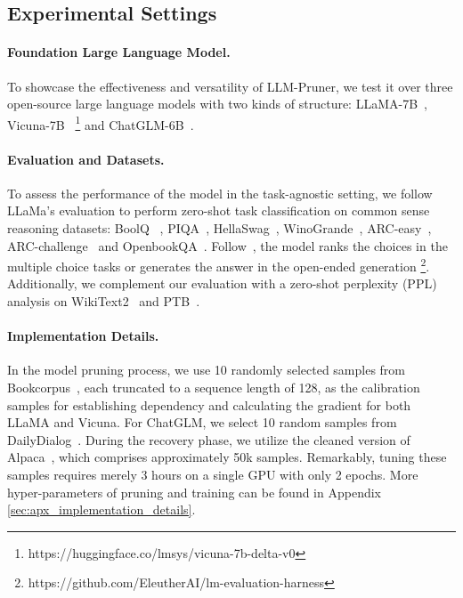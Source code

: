 \subsection{Experimental Settings}
\paragraph{Foundation Large Language Model.}
To showcase the effectiveness and versatility of LLM-Pruner, we test it over three open-source large language models with two kinds of structure: LLaMA-7B~\cite{touvron2023llama}, Vicuna-7B~\cite{vicuna2023} \footnote{https://huggingface.co/lmsys/vicuna-7b-delta-v0} and ChatGLM-6B~\cite{zeng2022glm}. %

\paragraph{Evaluation and Datasets.} To assess the performance of the model in the task-agnostic setting, we follow LLaMa's evaluation to perform zero-shot task classification on common sense reasoning datasets: BoolQ ~\cite{clark-etal-2019-boolq}, PIQA~\cite{Bisk2020piqa}, HellaSwag~\cite{zellers2019hellaswag}, WinoGrande~\cite{ai2:winogrande}, ARC-easy~\cite{allenai:arc}, ARC-challenge~\cite{allenai:arc} and OpenbookQA~\cite{OpenBookQA2018}. Follow~\cite{eval-harness}, the model ranks the choices in the multiple choice tasks or generates the answer in the open-ended generation \footnote{https://github.com/EleutherAI/lm-evaluation-harness}. Additionally, we complement our evaluation with a zero-shot perplexity (PPL) analysis on WikiText2~\cite{merity2016pointer} and PTB~\cite{marcus-etal-1993-building}. %

\paragraph{Implementation Details.} 
In the model pruning process, we use 10 randomly selected samples from Bookcorpus~\cite{Zhu_2015_ICCV}, each truncated to a sequence length of 128, as the calibration samples for establishing dependency and calculating the gradient for both LLaMA and Vicuna. For ChatGLM, we select 10 random samples from DailyDialog~\cite{li2017dailydialog}. During the recovery phase, we utilize the cleaned version of Alpaca~\cite{alpaca}, which comprises approximately 50k samples. Remarkably, tuning these samples requires merely 3 hours on a single GPU with only 2 epochs. More hyper-parameters of pruning and training can be found in Appendix \ref{sec:apx_implementation_details}.

